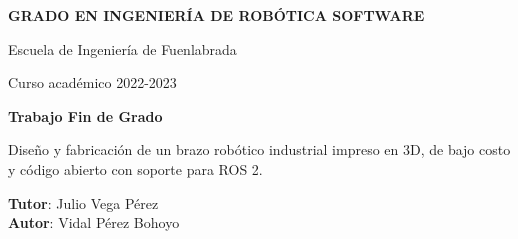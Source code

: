 \thispagestyle{empty}
\vspace{2cm}

\begin{figure}[htb]
  \centerline{}
\end{figure}

\begin{center}
  {\Large {\bf GRADO EN INGENIERÍA DE ROBÓTICA SOFTWARE}}
  \vspace{5mm}
 
  {\large {Escuela de Ingeniería de Fuenlabrada}}
  \vspace{5mm}

  {\large {Curso académico 2022-2023}}

  \vspace{1cm}

  {\large {\bf Trabajo Fin de Grado}}

  \vspace{2cm}

  {\Large {Diseño y fabricación de un brazo robótico industrial 
           impreso en 3D, de bajo costo y código abierto con soporte para ROS 2.  \\[1cm] }}

  \vspace{5cm}
  {\bf Tutor}: Julio Vega Pérez \\
  {\bf Autor}: Vidal Pérez Bohoyo
\end{center}

\clearpage
\thispagestyle{empty}
